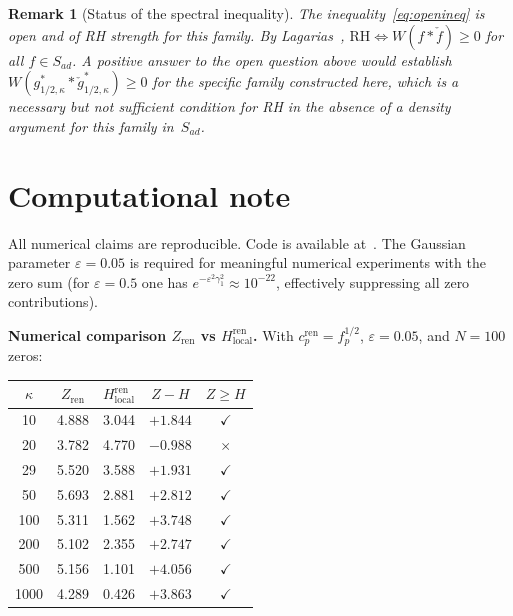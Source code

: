 \documentclass[11pt]{article}
\newtheorem*{remark*}{Remark}
\begin{document}
\begin{remark*}[Status of the spectral inequality]
The inequality~\eqref{eq:openineq} is open and of RH strength for this family.
By Lagarias~\cite{lagarias},
$\mathrm{RH} \iff W(f*\check f)\ge 0$ for all $f\in S_{ad}$.
A positive answer to the open question above would establish
$W(g^*_{1/2,\kappa}*\check g^*_{1/2,\kappa})\ge 0$ for the specific
family constructed here, which is a necessary but not sufficient
condition for RH in the absence of a density argument for this
family in~$S_{ad}$.
\end{remark*}

\section*{Computational note}

All numerical claims are reproducible. Code is available at~\cite{github}.
The Gaussian parameter $\varepsilon = 0.05$ is required for meaningful
numerical experiments with the zero sum (for $\varepsilon = 0.5$ one has
$e^{-\varepsilon^2\gamma_1^2} \approx 10^{-22}$, effectively
suppressing all zero contributions).

\medskip
\textbf{Numerical comparison $Z_{\mathrm{ren}}$ vs $H_{\mathrm{local}}^{\mathrm{ren}}$.}
With $c_p^{\mathrm{ren}} = f_p^{1/2}$, $\varepsilon=0.05$, and $N=100$ zeros:

\begin{center}
\begin{tabular}{ccccc}
\toprule
$\kappa$ & $Z_{\mathrm{ren}}$ & $H_{\mathrm{local}}^{\mathrm{ren}}$
         & $Z - H$ & $Z \ge H$ \\
\midrule
10   & 4.888 & 3.044 & $+1.844$ & $\checkmark$ \\
20   & 3.782 & 4.770 & $-0.988$ & $\times$ \\
29   & 5.520 & 3.588 & $+1.931$ & $\checkmark$ \\
50   & 5.693 & 2.881 & $+2.812$ & $\checkmark$ \\
100  & 5.311 & 1.562 & $+3.748$ & $\checkmark$ \\
200  & 5.102 & 2.355 & $+2.747$ & $\checkmark$ \\
500  & 5.156 & 1.101 & $+4.056$ & $\checkmark$ \\
1000 & 4.289 & 0.426 & $+3.863$ & $\checkmark$ \\
\bottomrule
\end{tabular}
\end{center}
\end{document}
